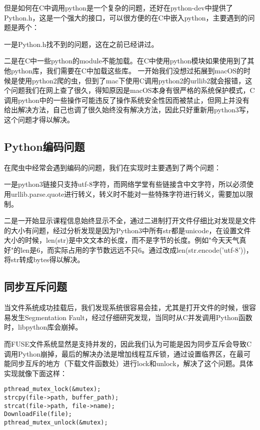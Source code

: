 但是如何在C中调用python是一个复杂的问题，还好在python-dev中提供了Python.h，这是一个强大的接口，可以很方便的在C中嵌入python，主要遇到的问题是两个：

一是Python.h找不到的问题，这在之前已经讲过。

二是在C中一些python的module不能加载。在C中使用python模块如果使用到了其他python库，我们需要在C中加载这些库。
一开始我们没想过拓展到macOS的时候是使用python2爬的虫，但到了mac下使用C调用python2的urllib2就会报错，这个问题我们在网上查了很久，得知原因是macOS本身有很严格的系统保护模式，C调用python中的一些操作可能违反了操作系统安全性因而被禁止，但网上并没有给出解决方法，自己也调了很久始终没有解决方法，因此只好重新用python3写，这个问题才得以解决。

\subsection{Python编码问题}

在爬虫中经常会遇到编码的问题，我们在实现时主要遇到了两个问题：

一是python3链接只支持utf-8字符，而网络学堂有些链接含中文字符，所以必须使用urllib.parse.quote进行转义，转义时不能对一些特殊字符进行转义，需要加以限制。

二是一开始显示课程信息始终显示不全，通过二进制打开文件仔细比对发现是文件的大小有问题，经过分析发现是因为Python3中所有str都是unicode，在设置文件大小的时候，len(str)是中文文本的长度，而不是字节的长度。例如"今天天气真好"的len是6，而实际占用的字节数远远不只6。通过改成len(str.encode('utf-8'))，将str转成bytes得以解决。

\subsection{同步互斥问题}

当文件系统成功挂载后，我们发现系统很容易会挂，尤其是打开文件的时候，很容易发生Segmentation Fault，经过仔细研究发现，当同时从C并发调用Python函数时，libpython库会崩掉。

而FUSE文件系统显然是支持并发的，因此我们认为可能是因为同步互斥会导致C调用Python崩掉，最后的解决办法是增加线程互斥锁，通过设置临界区，在最可能同步互斥的地方（下载文件函数处）进行lock和unlock，解决了这个问题。具体实现就像下面这样：

\begin{lstlisting}
pthread_mutex_lock(&mutex);
strcpy(file->path, buffer_path);
strcat(file->path, file->name);
DownloadFile(file);
pthread_mutex_unlock(&mutex);
\end{lstlisting}

